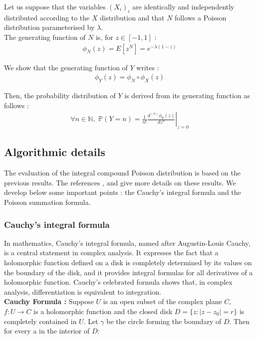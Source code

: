 Let us suppose that the variables $(X_i)_i$ are identically and independently distributed according to the $X$ distribution and that $N$ follows a Poisson distribution parameterised by $\lambda$.\\

The generating function of $N$ is, for $z\in[-1, 1]$ :
\begin{eqnarray}\label{PhiN}
\phi_{N}(z) = E[z^{N}] = e^{-\lambda(1-z)}
\end{eqnarray}

We show that the generating function of $Y$ writes :
\begin{eqnarray}
\phi_{Y}(z) = \phi_{N} \circ \phi_{X}(z)
\end{eqnarray}

Then, the probability distribution of $Y$ is derived from its generating function as follows :
\begin{eqnarray}
\forall n \in \mathbb{N}, \, \, \mathbb{P}(Y = n) = \displaystyle \left. \frac{1}{n!}\frac{d^{(n)}\phi_{Y}(z)}{dz^n } \right|_{z=0}
\end{eqnarray}


\subsection{Algorithmic details}

The evaluation of the integral compound Poisson distribution is based on the previous results. The references \cite{Abate}, \cite{Stoer} and \cite{Feller} give more details on these results. We develop below some important points : the Cauchy's integral formula and the Poisson summation formula.

\subsubsection{Cauchy's integral formula}

In mathematics, Cauchy's integral formula, named after Augustin-Louis Cauchy, is a central statement in complex analysis. It expresses the fact that a holomorphic function defined on a disk is completely determined by its values on the boundary of the disk, and it provides integral formulas for all derivatives of a holomorphic function. Cauchy's celebrated formula shows that, in complex analysis, differentiation is equivalent to integration.\\

{\bf Cauchy Formula :} Suppose $U$ is an open subset of the complex plane $C$, $f : U \rightarrow C$ is a holomorphic function and the closed disk $D = \{ z : | z - z_0| = r\}$ is completely contained in $U$. Let $\gamma$ be the circle forming the boundary of $D$. Then for every a in the interior of $D$:

